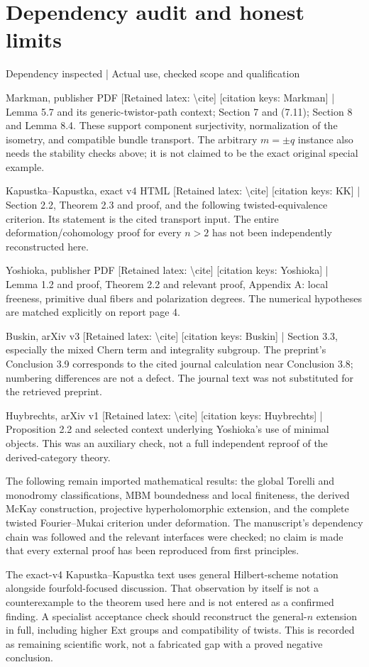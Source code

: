 \documentclass[10pt]{article}
\begin{document}
\section*{Dependency audit and honest limits}
Dependency inspected | Actual use, checked scope and qualification\par
Markman, publisher PDF [Retained latex: \textbackslash{}cite] [citation keys: Markman] | Lemma 5.7 and its generic-twistor-path context; Section 7 and (7.11); Section 8 and Lemma 8.4. These support component surjectivity, normalization of the isometry, and compatible bundle transport. The arbitrary \(m=\pm q\) instance also needs the stability checks above; it is not claimed to be the exact original special example.\par
Kapustka–Kapustka, exact v4 HTML [Retained latex: \textbackslash{}cite] [citation keys: KK] | Section 2.2, Theorem 2.3 and proof, and the following twisted-equivalence criterion. Its statement is the cited transport input. The entire deformation/cohomology proof for every \(n>2\) has not been independently reconstructed here.\par
Yoshioka, publisher PDF [Retained latex: \textbackslash{}cite] [citation keys: Yoshioka] | Lemma 1.2 and proof, Theorem 2.2 and relevant proof, Appendix A: local freeness, primitive dual fibers and polarization degrees. The numerical hypotheses are matched explicitly on report page 4.\par
Buskin, arXiv v3 [Retained latex: \textbackslash{}cite] [citation keys: Buskin] | Section 3.3, especially the mixed Chern term and integrality subgroup. The preprint’s Conclusion 3.9 corresponds to the cited journal calculation near Conclusion 3.8; numbering differences are not a defect. The journal text was not substituted for the retrieved preprint.\par
Huybrechts, arXiv v1 [Retained latex: \textbackslash{}cite] [citation keys: Huybrechts] | Proposition 2.2 and selected context underlying Yoshioka’s use of minimal objects. This was an auxiliary check, not a full independent reproof of the derived-category theory.\par
The following remain imported mathematical results: the global Torelli and monodromy classifications, MBM boundedness and local finiteness, the derived McKay construction, projective hyperholomorphic extension, and the complete twisted Fourier–Mukai criterion under deformation. The manuscript’s dependency chain was followed and the relevant interfaces were checked; no claim is made that every external proof has been reproduced from first principles.\par
The exact-v4 Kapustka–Kapustka text uses general Hilbert-scheme notation alongside fourfold-focused discussion. That observation by itself is not a counterexample to the theorem used here and is not entered as a confirmed finding. A specialist acceptance check should reconstruct the general-\(n\) extension in full, including higher Ext groups and compatibility of twists. This is recorded as remaining scientific work, not a fabricated gap with a proved negative conclusion.\par
\end{document}
